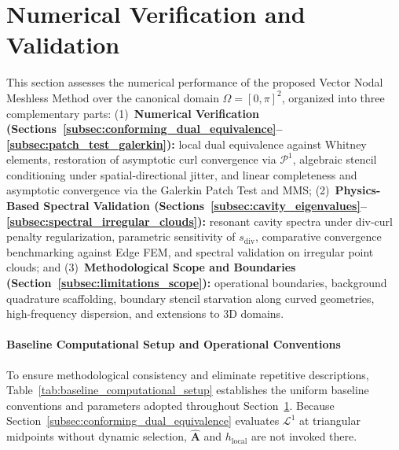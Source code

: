 \documentclass[preprint,12pt]{elsarticle}
\begin{document}
\section{Numerical Verification and Validation}
\label{sec:numerical_results}

This section assesses the numerical performance of the proposed Vector Nodal Meshless Method over the canonical domain $\Omega = [0, \pi]^2$, organized into three complementary parts: (1)~\textbf{Numerical Verification (Sections~\ref{subsec:conforming_dual_equivalence}--\ref{subsec:patch_test_galerkin}):} local dual equivalence against Whitney elements, restoration of asymptotic curl convergence via $\mathcal{P}^1$, algebraic stencil conditioning under spatial-directional jitter, and linear completeness and asymptotic convergence via the Galerkin Patch Test and MMS; (2)~\textbf{Physics-Based Spectral Validation (Sections~\ref{subsec:cavity_eigenvalues}--\ref{subsec:spectral_irregular_clouds}):} resonant cavity spectra under div-curl penalty regularization, parametric sensitivity of $s_{\mathrm{div}}$, comparative convergence benchmarking against Edge FEM, and spectral validation on irregular point clouds; and (3)~\textbf{Methodological Scope and Boundaries (Section~\ref{subsec:limitations_scope}):} operational boundaries, background quadrature scaffolding, boundary stencil starvation along curved geometries, high-frequency dispersion, and extensions to 3D domains.

\paragraph{Baseline Computational Setup and Operational Conventions}
To ensure methodological consistency and eliminate repetitive descriptions, Table~\ref{tab:baseline_computational_setup} establishes the uniform baseline conventions and parameters adopted throughout Section~\ref{sec:numerical_results}. Because Section~\ref{subsec:conforming_dual_equivalence} evaluates $\mathcal{L}^1$ at triangular midpoints without dynamic selection, $\widehat{\mathbf{A}}$ and $h_{\mathrm{local}}$ are not invoked there.
\end{document}
